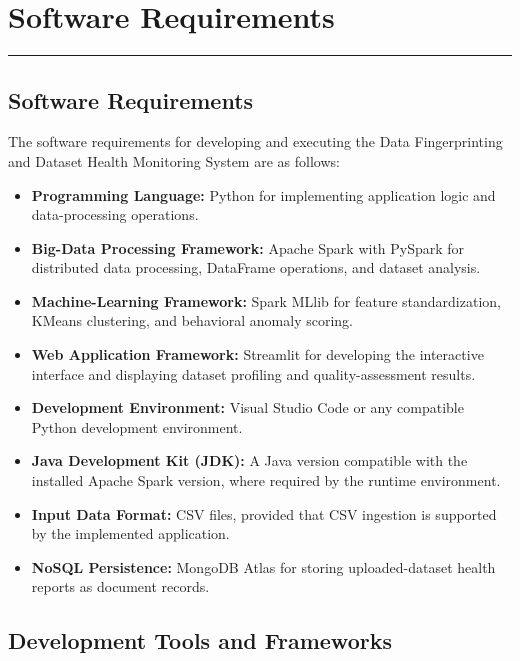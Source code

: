 \documentclass[12pt,a4paper]{report}
\begin{document}
\chapter{Software Requirements}
\rule{\textwidth}{2pt}


\section{Software Requirements}

The software requirements for developing and executing the Data Fingerprinting and Dataset Health Monitoring System are as follows:

\begin{itemize}
    \item \textbf{Programming Language:} Python for implementing application logic and data-processing operations.
    
    \item \textbf{Big-Data Processing Framework:} Apache Spark with PySpark for distributed data processing, DataFrame operations, and dataset analysis.

    \item \textbf{Machine-Learning Framework:} Spark MLlib for feature standardization, KMeans clustering, and behavioral anomaly scoring.
    
    \item \textbf{Web Application Framework:} Streamlit for developing the interactive interface and displaying dataset profiling and quality-assessment results.
    
    \item \textbf{Development Environment:} Visual Studio Code or any compatible Python development environment.
    
    \item \textbf{Java Development Kit (JDK):} A Java version compatible with the installed Apache Spark version, where required by the runtime environment.
    
    \item \textbf{Input Data Format:} CSV files, provided that CSV ingestion is supported by the implemented application.

    \item \textbf{NoSQL Persistence:} MongoDB Atlas for storing uploaded-dataset health reports as document records.
\end{itemize}


\section{Development Tools and Frameworks}
\end{document}
